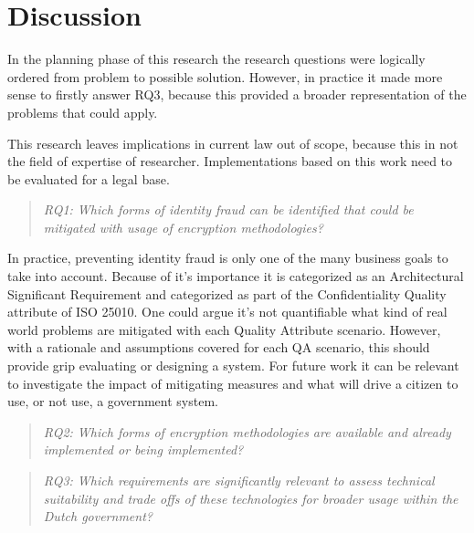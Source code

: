 \chapter{Discussion}\label{s:discussion}
In the planning phase of this research the research questions were logically ordered from problem to possible solution. However, in practice it made more sense to firstly answer RQ3, because this provided a broader representation of the problems that could apply. 

This research leaves implications in current law out of scope, because this in not the field of expertise of researcher. Implementations based on this work need to be evaluated for a legal base.

\begin{quote}\emph{RQ1: Which forms of identity fraud can be identified that could be mitigated with usage of encryption methodologies?}\end{quote}
In practice, preventing identity fraud is only one of the many business goals to take into account. Because of it's importance it is categorized as an Architectural Significant Requirement and categorized as part of the Confidentiality Quality attribute of ISO 25010. One could argue it's not quantifiable what kind of real world problems are mitigated with each Quality Attribute scenario. However, with a rationale and assumptions covered for each QA scenario, this should provide grip evaluating or designing a system. For future work it can be relevant to investigate the impact of mitigating measures and what will drive a citizen to use, or not use, a government system.
\begin{quote}\emph{RQ2: Which forms of encryption methodologies are available and already implemented or being implemented?}\end{quote}

\begin{quote}\emph{RQ3: Which requirements are significantly relevant to assess technical suitability and trade offs of these technologies for broader usage within the Dutch government?}\end{quote}

